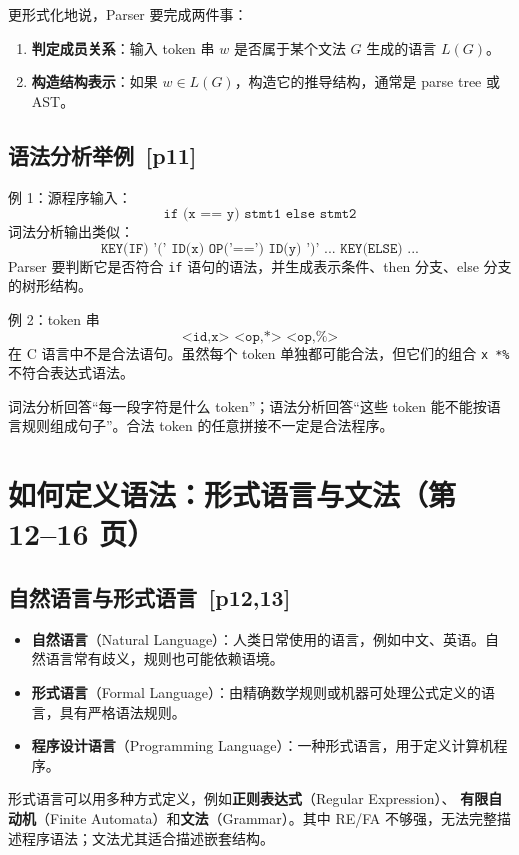 \documentclass[UTF8,fontset=none,11pt]{ctexart}
\newenvironment{warnbox}[1][]{%
  \par\medskip\noindent{\color{warnrule}\rule{\linewidth}{1.1pt}}\par\nopagebreak
  \noindent{\bfseries\color{warnrule}#1}\par\nopagebreak\smallskip}%
  {\par\nopagebreak\smallskip\noindent{\color{warnrule}\rule{\linewidth}{0.4pt}}\par\medskip}
\newcommand{\pg}[1]{\texorpdfstring{{\small\color{graytext}\,[p#1]}}{ [p#1]}}
\newcommand{\term}[2]{\textbf{#1}（#2）}
\newcommand{\code}[1]{\texttt{#1}}
\begin{document}
更形式化地说，Parser 要完成两件事：
\begin{enumerate}
  \item \textbf{判定成员关系}：输入 token 串 \(w\) 是否属于某个文法 \(G\) 生成的语言 \(L(G)\)。
  \item \textbf{构造结构表示}：如果 \(w\in L(G)\)，构造它的推导结构，通常是 parse tree 或 AST。
\end{enumerate}

\subsection{语法分析举例 \pg{11}}
例 1：源程序输入：
\[
\code{if (x == y) stmt1 else stmt2}
\]
词法分析输出类似：
\[
\code{KEY(IF) '(' ID(x) OP('==') ID(y) ')' ... KEY(ELSE) ...}
\]
Parser 要判断它是否符合 \code{if} 语句的语法，并生成表示条件、then 分支、else 分支的树形结构。

例 2：token 串
\[
\code{<id,x> <op,*> <op,\%>}
\]
在 C 语言中不是合法语句。虽然每个 token 单独都可能合法，但它们的组合 \code{x *\%} 不符合表达式语法。

\begin{warnbox}[关键区分]
词法分析回答“每一段字符是什么 token”；语法分析回答“这些 token 能不能按语言规则组成句子”。合法 token 的任意拼接不一定是合法程序。
\end{warnbox}

\section{如何定义语法：形式语言与文法（第 12--16 页）}

\subsection{自然语言与形式语言 \pg{12,13}}
\begin{itemize}
  \item \term{自然语言}{Natural Language}：人类日常使用的语言，例如中文、英语。自然语言常有歧义，规则也可能依赖语境。
  \item \term{形式语言}{Formal Language}：由精确数学规则或机器可处理公式定义的语言，具有严格语法规则。
  \item \term{程序设计语言}{Programming Language}：一种形式语言，用于定义计算机程序。
\end{itemize}

形式语言可以用多种方式定义，例如\term{正则表达式}{Regular Expression}、
\term{有限自动机}{Finite Automata}和\term{文法}{Grammar}。其中 RE/FA 不够强，无法完整描述程序语法；文法尤其适合描述嵌套结构。
\end{document}
